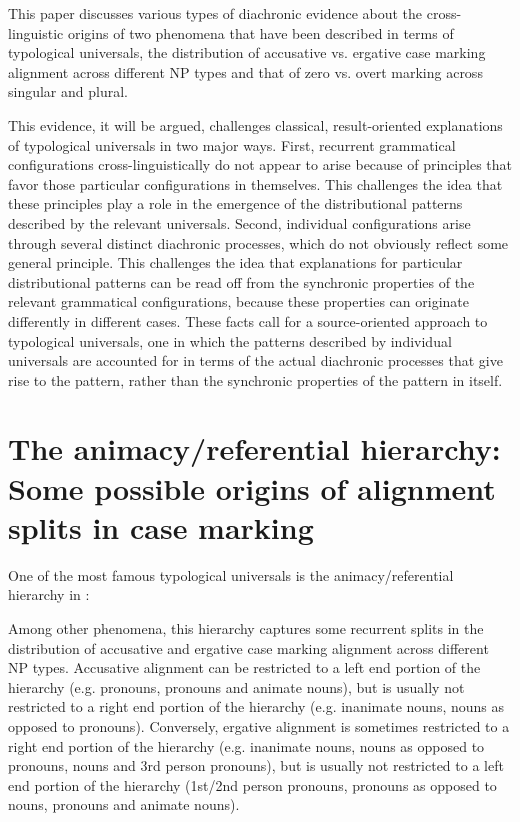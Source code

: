 \documentclass[output=paper]{langsci/langscibook}
\begin{document}
This paper discusses various types of diachronic evidence about the
cross-linguistic origins of two phenomena that have been described in
terms of typological universals, the distribution of accusative vs.
ergative case marking alignment across different NP types and that of
zero vs. overt marking across singular and plural. 

This evidence, it will
be argued, challenges classical, result-oriented explanations of
typological universals in two major ways.  First, recurrent grammatical
configurations cross-linguistically do not appear to arise because of principles that favor
those particular configurations in themselves. This challenges the idea that these principles play a
role in the emergence of the distributional patterns described by the
relevant universals. 
Second, individual configurations arise through several distinct
  diachronic processes, which do not obviously reflect some
  general principle. This challenges the idea that explanations for
  particular distributional patterns can be read off from the
  synchronic properties of the relevant grammatical configurations,
  because these properties can originate differently in different
  cases. 
These facts call for a source-oriented approach to
  typological universals, one in which the patterns described by
  individual universals are accounted for in terms of the actual
  diachronic processes that give rise to the pattern, rather
  than the synchronic properties of the  pattern in itself.


\section{The animacy/referential hierarchy: Some possible origins of
  alignment splits in case marking}\label{alignment}

One of the most famous typological universals is the animacy/referential hierarchy in :



Among other phenomena, this hierarchy captures some recurrent splits
in the distribution of
accusative and ergative case marking alignment
 across different NP types.
 Accusative alignment
  can be restricted to a left end portion of the hierarchy (e.g.  pronouns, pronouns and animate
nouns), but is usually not restricted to a right end portion of the hierarchy (e.g. inanimate nouns, nouns as opposed to
pronouns). Conversely, ergative alignment  is sometimes restricted to a right end portion of the hierarchy (e.g. inanimate
nouns, nouns as opposed to pronouns, nouns and 3rd person pronouns), but is usually not restricted to a left end portion of the hierarchy
(1st/2nd person pronouns, pronouns as opposed to nouns, pronouns and animate nouns).
\end{document}
